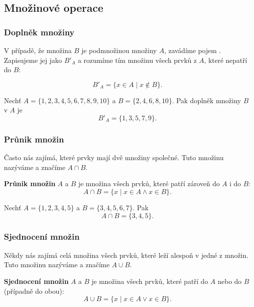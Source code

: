 \documentclass[12pt,a4paper]{article}
\begin{document}
\subsection{Množinové operace}
\subsubsection*{Doplněk množiny}

V případě, že množina $B$ je podmnožinou množiny $A$, zavádíme pojem .  
Zapisujeme jej jako $B'_A$ a rozumíme tím množinu všech prvků z $A$, které nepatří do $B$:  

\begin{definitionbox}
\[
B'_A = \{x \in A \mid x \notin B\}.
\]
\end{definitionbox}

\begin{examplebox}
Nechť $A = \{1,2,3,4,5,6,7,8,9,10\}$ a $B = \{2,4,6,8,10\}$.  
Pak doplněk množiny $B$ v $A$ je
\[
B'_A = \{1,3,5,7,9\}.
\]
\end{examplebox}

\subsubsection*{Průnik množin}

Často nás zajímá, které prvky mají dvě množiny společné.  
Tuto množinu nazýváme  a značíme $A \cap B$.  

\begin{definitionbox}
\textbf{Průnik množin} $A$ a $B$ je množina všech prvků, které patří zároveň do $A$ i do $B$:  
\[
A \cap B = \{x \mid x \in A \land x \in B\}.
\]
\end{definitionbox}

\begin{examplebox}
Nechť $A = \{1,2,3,4,5\}$ a $B = \{3,4,5,6,7\}$.  
Pak
\[
A \cap B = \{3,4,5\}.
\]
\end{examplebox}


\subsubsection*{Sjednocení množin}

Někdy nás zajímá celá množina všech prvků, které leží alespoň v jedné z množin.  
Tuto množinu nazýváme  a značíme $A \cup B$.  

\begin{definitionbox}
\textbf{Sjednocení množin} $A$ a $B$ je množina všech prvků, které patří do $A$ nebo do $B$ (případně do obou):  
\[
A \cup B = \{x \mid x \in A \lor x \in B\}.
\]
\end{definitionbox}
\end{document}
